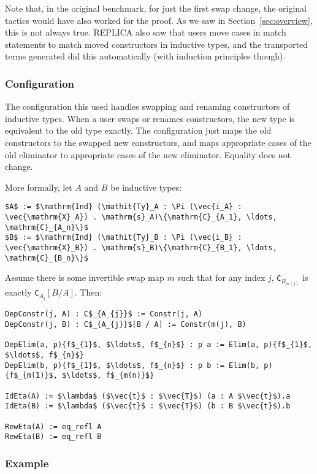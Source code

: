 Note that, in the original benchmark, for just the first swap change,
the original tactics would have also worked for the proof. 
As we saw in Section~\ref{sec:overview}, this is not always true.
REPLICA also saw that users move cases in match statements to match moved constructors
in inductive types, and the transported terms \toolname generated did this automatically
(with induction principles though).

\subsubsection{Configuration}
The configuration this used handles swapping and renaming constructors of inductive types.
When a user swaps or renames constructors, the new type is equivalent to the old type exactly.
The configuration just maps the old constructors to the swapped new constructors, and maps appropriate
cases of the old eliminator to appropriate cases of the new eliminator.
Equality does not change.

More formally, let $A$ and $B$ be inductive types:

\begin{lstlisting}
$A$ := $\mathrm{Ind} (\mathit{Ty}_A : \Pi (\vec{i_A} : \vec{\mathrm{X}_A}) . \mathrm{s}_A)\{\mathrm{C}_{A_1}, \ldots, \mathrm{C}_{A_n}\}$
$B$ := $\mathrm{Ind} (\mathit{Ty}_B : \Pi (\vec{i_B} : \vec{\mathrm{X}_B}) . \mathrm{s}_B)\{\mathrm{C}_{B_1}, \ldots, \mathrm{C}_{B_n}\}$
\end{lstlisting}		
Assume there is some invertible swap map $m$ such that for any index $j$,
\lstinline{C}$_{B_{m(j)}}$ is exactly \lstinline{C}$_{A_j}[B / A]$.
Then:

\begin{lstlisting}
DepConstr(j, A) : C$_{A_{j}}$ := Constr(j, A) 
DepConstr(j, B) : C$_{A_{j}}$[B / A] := Constr(m(j), B)

DepElim(a, p){f$_{1}$, $\ldots$, f$_{n}$} : p a := Elim(a, p){f$_{1}$, $\ldots$, f$_{n}$}
DepElim(b, p){f$_{1}$, $\ldots$, f$_{n}$} : p b := Elim(b, p){f$_{m(1)}$, $\ldots$, f$_{m(n)}$}

IdEta(A) := $\lambda$ ($\vec{t}$ : $\vec{T}$) (a : A $\vec{t}$).a
IdEta(B) := $\lambda$ ($\vec{t}$ : $\vec{T}$) (b : B $\vec{t}$).b

RewEta(A) := eq_refl A
RewEta(B) := eq_refl B
\end{lstlisting}

\subsubsection{Example}

